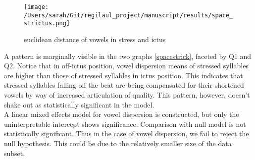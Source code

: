 \begin{figure}[htbp]
\centering
\texttt{[image: /Users/sarah/Git/regilaul\_project/manuscript/results/space\_strictus.png]}
\caption{euclidean distance of vowels in stress and ictus}
\label{spcstrick}

\end{figure}
A pattern is marginally visible in the two graphs  \ref{spacestrick}, faceted by Q1 and Q2. Notice that in off-ictus position, vowel dispersion means of stressed syllables are higher than those of stressed syllables in ictus position. This indicates that stressed syllables falling off the beat are being compensated for their shortened vowels by way of increased articulation of quality. This pattern, however, doesn't shake out as statistically significant in the model. \\
A linear mixed effects model for vowel dispersion is constructed, but only the uninterpretable intercept shows significance. 
Comparison with null model is not statistically significant. Thus in the case of vowel dispersion, we fail to reject the null hypothesis. This could be due to the relatively smaller size of the data subset. 


